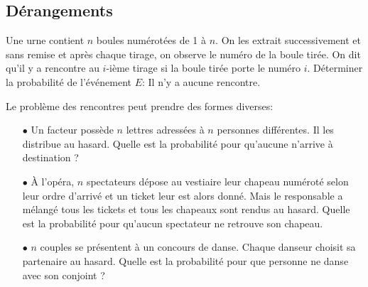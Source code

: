 
\subsection{Dérangements}

\begin{exercice} 
Une urne contient $n$ boules num\'erot\'ees de 1 \`a $n$. On les extrait successivement et sans remise et apr\`es chaque tirage, on observe le num\'ero de la boule tir\'ee. On dit qu'il y a rencontre au $i$-i\`eme tirage si la boule tir\'ee porte le num\'ero $i$. D\'eterminer la probabilit\'e de l'\'ev\'enement $E$: \og Il n'y a aucune rencontre\fg.

\begin{rems}
Le probl\`{e}me des rencontres peut prendre des formes diverses:
\begin{itemize}
\item[$\bullet$] Un facteur poss\`{e}de $n$ lettres adress\'ees \`{a} $n$ personnes diff\'erentes. Il les distribue au hasard. Quelle est la probabilit\'e pour qu'aucune n'arrive \`{a} destination ?
\item[$\bullet$] \`{A} l'op\'era, $n$ spectateurs d\'epose au vestiaire leur chapeau num\'erot\'e selon leur ordre d'arriv\'e et un ticket leur est alors donn\'e. Mais le responsable a m\'elang\'e tous les tickets et tous les chapeaux sont rendus au hasard. Quelle est la probabilit\'e pour qu'aucun spectateur ne retrouve son chapeau.
\item[$\bullet$] $n$ couples se pr\'esentent \`{a} un concours de danse. Chaque danseur choisit sa partenaire au hasard. Quelle est la probabilit\'e pour que personne ne danse avec son conjoint ?
\end{itemize}
\end{rems}

\end{exercice}



